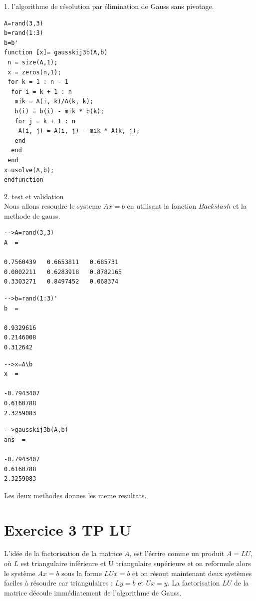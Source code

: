 \documentclass[12pt]{report}
\begin{document}
1. l’algorithme de résolution par élimination de Gauss sans pivotage.

\begin{lstlisting}
A=rand(3,3)
b=rand(1:3)
b=b'
function [x]= gausskij3b(A,b)
 n = size(A,1);
 x = zeros(n,1);
 for k = 1 : n - 1
  for i = k + 1 : n
   mik = A(i, k)/A(k, k);
   b(i) = b(i) - mik * b(k);
   for j = k + 1 : n
    A(i, j) = A(i, j) - mik * A(k, j);
   end 
  end 
 end 
x=usolve(A,b);
endfunction
\end{lstlisting}
2. test et validation\\

Nous allons resoudre le systeme $Ax=b$ en utilisant la fonction $Backslash$ et la methode de gauss.\\
\begin{lstlisting}
-->A=rand(3,3)
A  = 

0.7560439   0.6653811   0.685731 
0.0002211   0.6283918   0.8782165
0.3303271   0.8497452   0.068374 
\end{lstlisting}

\begin{lstlisting}
-->b=rand(1:3)'
b  = 

0.9329616
0.2146008
0.312642 
\end{lstlisting}

\begin{lstlisting}
-->x=A\b
x  = 

-0.7943407
0.6160788
2.3259083 
\end{lstlisting}

\begin{lstlisting}
-->gausskij3b(A,b)
ans  =

-0.7943407
0.6160788
2.3259083 
\end{lstlisting}

Les deux methodes donnes les meme resultats.

\section{Exercice 3 TP LU}

L’idée de la factorisation de la matrice $A$, est l’écrire comme un produit $A = LU$, où $L$ est triangulaire inférieure et U triangulaire supérieure et on reformule alors le système $Ax = b$ sous la forme $LUx = b$ et on résout maintenant deux systèmes faciles à résoudre car triangulaires : $Ly = b$ et $Ux = y$. La factorisation $LU$ de la matrice découle immédiatement de l’algorithme de Gauss.\\
\end{document}
